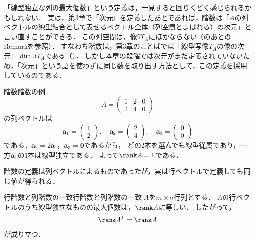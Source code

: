 \begin{remark}[階数の定義について]
  「線型独立な列の最大個数」という定義は，一見すると回りくどく感じられるかもしれない．
  実は，第3章で「次元」を定義したあとであれば，階数は「$A$の列ベクトルの線型結合として表せるベクトル全体（列空間とよばれる）の次元」と言い直すことができる．
  この列空間は，像$\Im T_A$にほかならない（のあとのRemarkを参照）．
  すなわち階数は，第3章のことばでは「線型写像$T_A$の像の次元」$\dim \Im T_A$である（）．
  しかし本章の段階では次元がまだ定義されていないため，「次元」という語を使わずに同じ数を取り出す方法として，この定義を採用しているのである．
\end{remark}

\begin{example}{階数}{階数の例}
  \[
    A = \begin{pmatrix} 1 & 2 & 0 \\ 2 & 4 & 0 \end{pmatrix}
  \]
  の列ベクトルは
  \[
    \bm{a}_1 = \begin{pmatrix} 1 \\ 2 \end{pmatrix}, \quad
    \bm{a}_2 = \begin{pmatrix} 2 \\ 4 \end{pmatrix}, \quad
    \bm{a}_3 = \begin{pmatrix} 0 \\ 0 \end{pmatrix}
  \]
  である．$\bm{a}_2 = 2\bm{a}_1$，$\bm{a}_3 = \bm{0}$であるから，
  どの$2$本を選んでも線型従属であり，一方$\bm{a}_1$の$1$本は線型独立である．
  よって$\rank A = 1$である．
\end{example}

階数の定義は列ベクトルによるものであったが，実は行ベクトルで定義しても同じ値が得られる．

\begin{theorem}{行階数と列階数の一致}{行階数と列階数の一致}
  $A$を$m \times n$行列とする．
  $A$の行ベクトルのうち線型独立なものの最大個数は，$\rank A$に等しい．
  したがって，
  \[
    \rank A^\mathsf{T} = \rank A
  \]
  が成り立つ．
\end{theorem}

